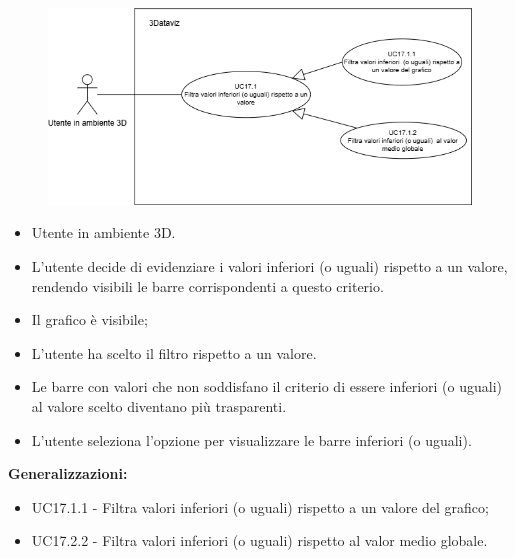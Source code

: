 \begin{figure}[H]\centering
    \includegraphics[scale=0.7]{template/images/UC17.1.png}
    \caption{}
\end{figure}
\UCdsc
{ %
    \begin{itemize}
        \item Utente in ambiente 3D.
    \end{itemize}
}
{ %
    \begin{itemize}
        \item L'utente decide di evidenziare i valori inferiori (o uguali) rispetto a un valore, rendendo visibili le barre corrispondenti a questo criterio.
    \end{itemize}
}
{ %
    \begin{itemize}
        \item Il grafico è visibile;
        \item L'utente ha scelto il filtro rispetto a un valore.
    \end{itemize}
}
{ %
    \begin{itemize}
        \item Le barre con valori che non soddisfano il criterio di essere inferiori (o uguali) al valore scelto diventano più trasparenti.
    \end{itemize}
}
{ %
    \begin{itemize}
        \item L'utente seleziona l'opzione per visualizzare le barre inferiori (o uguali).
    \end{itemize}
    \item \textbf{Generalizzazioni:} \begin{itemize}
        \item UC17.1.1 - Filtra valori inferiori (o uguali) rispetto a un valore del grafico;
        \item UC17.2.2 - Filtra valori inferiori (o uguali) rispetto al valor medio globale.
    \end{itemize}
}



